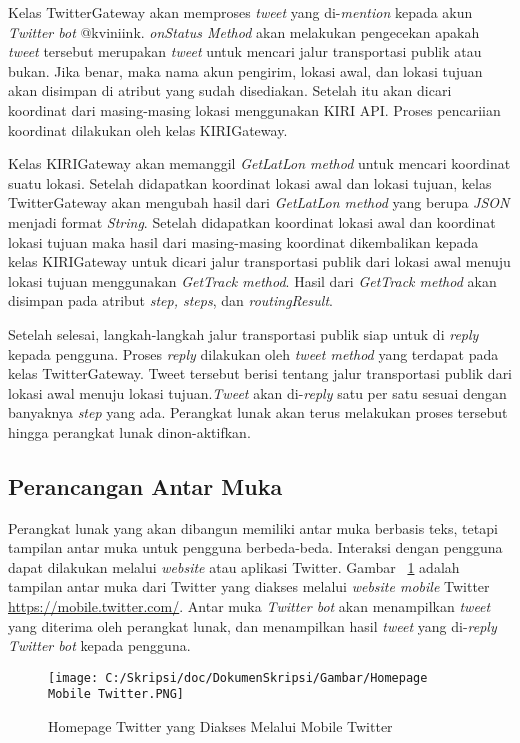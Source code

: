 Kelas TwitterGateway akan memproses \textit{tweet} yang di-\textit{mention} kepada akun \textit{Twitter bot} @kviniink. \textit{onStatus Method} akan melakukan pengecekan apakah \textit{tweet} tersebut merupakan \textit{tweet} untuk mencari jalur transportasi publik atau bukan. Jika benar, maka nama akun pengirim, lokasi awal, dan lokasi tujuan akan disimpan di atribut yang sudah disediakan. Setelah itu akan dicari koordinat dari masing-masing lokasi menggunakan KIRI API. Proses pencariian koordinat dilakukan oleh kelas KIRIGateway.

Kelas KIRIGateway akan memanggil \textit{GetLatLon method} untuk mencari koordinat suatu lokasi. Setelah didapatkan koordinat lokasi awal dan lokasi tujuan, kelas TwitterGateway akan mengubah hasil dari \textit{GetLatLon method} yang berupa \textit{JSON} menjadi format \textit{String}. Setelah didapatkan koordinat lokasi awal dan koordinat lokasi tujuan maka hasil dari masing-masing koordinat dikembalikan kepada kelas KIRIGateway untuk dicari jalur transportasi publik dari lokasi awal menuju lokasi tujuan menggunakan \textit{GetTrack method}. Hasil dari \textit{GetTrack method} akan disimpan pada atribut \textit{step, steps}, dan \textit{routingResult}.

Setelah selesai, langkah-langkah jalur transportasi publik siap untuk di \textit{reply} kepada pengguna. Proses \textit{reply} dilakukan oleh \textit{tweet method} yang terdapat pada kelas TwitterGateway. Tweet tersebut berisi tentang jalur transportasi publik dari lokasi awal menuju lokasi tujuan.\textit{Tweet} akan di-\textit{reply} satu per satu sesuai dengan banyaknya \textit{step} yang ada. Perangkat lunak akan terus melakukan proses tersebut hingga perangkat lunak dinon-aktifkan.

\newpage
\subsection{Perancangan Antar Muka}
Perangkat lunak yang akan dibangun memiliki antar muka berbasis teks, tetapi tampilan antar muka untuk pengguna berbeda-beda. Interaksi dengan pengguna dapat dilakukan melalui \textit{website} atau aplikasi Twitter. Gambar ~\ref{fig:Homepage Mobile Twitter} adalah tampilan antar muka dari Twitter yang diakses melalui \textit{website mobile} Twitter \url{https://mobile.twitter.com/}. Antar muka \textit{Twitter bot} akan menampilkan \textit{tweet} yang diterima oleh perangkat lunak, dan menampilkan hasil \textit{tweet} yang di-\textit{reply} \textit{Twitter bot} kepada pengguna.

\begin{figure}[htbp]
	\centering
		\texttt{[image: C:/Skripsi/doc/DokumenSkripsi/Gambar/Homepage Mobile Twitter.PNG]}
	\caption{Homepage Twitter yang Diakses Melalui Mobile Twitter}
	\label{fig:Homepage Mobile Twitter}
\end{figure}



